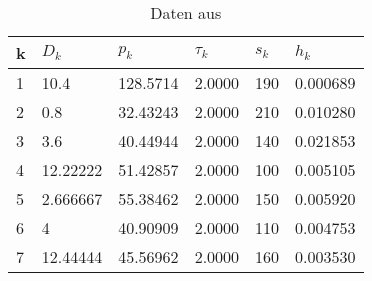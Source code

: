 \begin{table}[H]
\begin{center}
\begin{tabular}{llllll}
\hline
\multicolumn{1}{|l|}{k} & \multicolumn{1}{l|}{$D_k$} & \multicolumn{1}{l|}{$p_k$} & \multicolumn{1}{l|}{${\tau}_k$} & \multicolumn{1}{l|}{$s_k$} & \multicolumn{1}{l|}{$h_k$} \\ \hline
1                       & 10.4                      & 128.5714                  & 2.0000                          & 190                       & 0.000689                  \\
2                       & 0.8                       & 32.43243                  & 2.0000                          & 210                       & 0.010280                  \\
3                       & 3.6                       & 40.44944                  & 2.0000                          & 140                       & 0.021853                  \\
4                       & 12.22222                  & 51.42857                  & 2.0000                          & 100                       & 0.005105                  \\
5                       & 2.666667                  & 55.38462                  & 2.0000                          & 150                       & 0.005920                  \\
6                       & 4                         & 40.90909                  & 2.0000                          & 110                       & 0.004753                  \\
7                       & 12.44444                  & 45.56962                  & 2.0000                          & 160                       & 0.003530                 
\end{tabular}
\caption[Daten aus \cite{Templ09}]{Daten aus \cite{Templ09}}
\end{center}
\end{table}